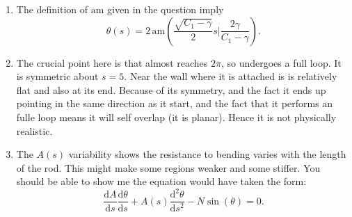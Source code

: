 \documentclass[]{article}
\newcommand{\rmd}{\mathrm{d}}
\newcommand{\deriv}[2]{\frac{\rmd#1}{\rmd #2}}
\newcommand{\derivn}[3]{\frac{\rmd^{#3} #1}{\rmd #2^{#3}}}
\begin{document}
\begin{enumerate}[label=(\alph*)]
{Since $s$ and $\theta$ must be real we require $ C_1-\gamma>0$ so $C_1>N/A$.
}\item{ 
The definition of $\mathrm{am}$ given in the question imply 
\begin{equation}
\theta(s)  = 2\,\mathrm{am}\left(\frac{\sqrt{C_1-\gamma}}{2} s \bigg\vert \frac{2\gamma}{C_1-\gamma}\right).
\end{equation}
}\item{
The crucial point here is that almost reaches $2\pi$, so undergoes a full loop. It is symmetric about $s=5$. Near the wall where it is attached is is relatively flat and also at its end. Because of its symmetry, and the fact it ends up pointing in the same direction as it start, and the fact that it performs an fulle loop means it will self overlap (it is planar).  Hence it is not physically realistic.
} 
\item{The $A(s)$ variability shows the resistance to bending varies with the length of the rod. This might make some regions weaker and some stiffer. You should be able to show me the equation would have taken the form:
\begin{equation}
\deriv{A}{s}\deriv{\theta}{s} +  A(s)\derivn{\theta}{s}{2} -N\sin(\theta)=0.
\end{equation}
 }
\end{enumerate}	
\end{document}
